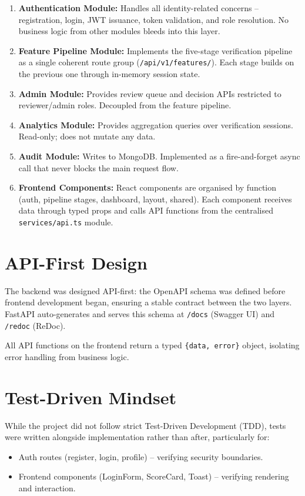 \documentclass[12pt,a4paper]{report}
\begin{document}
\begin{enumerate}
    \item \textbf{Authentication Module:} Handles all identity-related concerns -- registration, login, JWT issuance, token validation, and role resolution. No business logic from other modules bleeds into this layer.
    \item \textbf{Feature Pipeline Module:} Implements the five-stage verification pipeline as a single coherent route group (\texttt{/api/v1/features/}). Each stage builds on the previous one through in-memory session state.
    \item \textbf{Admin Module:} Provides review queue and decision APIs restricted to reviewer/admin roles. Decoupled from the feature pipeline.
    \item \textbf{Analytics Module:} Provides aggregation queries over verification sessions. Read-only; does not mutate any data.
    \item \textbf{Audit Module:} Writes to MongoDB. Implemented as a fire-and-forget async call that never blocks the main request flow.
    \item \textbf{Frontend Components:} React components are organised by function (auth, pipeline stages, dashboard, layout, shared). Each component receives data through typed props and calls API functions from the centralised \texttt{services/api.ts} module.
\end{enumerate}

\section{API-First Design}

The backend was designed API-first: the OpenAPI schema was defined before frontend development began, ensuring a stable contract between the two layers. FastAPI auto-generates and serves this schema at \texttt{/docs} (Swagger UI) and \texttt{/redoc} (ReDoc).

All API functions on the frontend return a typed \texttt{\{data, error\}} object, isolating error handling from business logic.

\section{Test-Driven Mindset}

While the project did not follow strict Test-Driven Development (TDD), tests were written alongside implementation rather than after, particularly for:
\begin{itemize}
    \item Auth routes (register, login, profile) -- verifying security boundaries.
    \item Frontend components (LoginForm, ScoreCard, Toast) -- verifying rendering and interaction.
\end{itemize}
\end{document}
